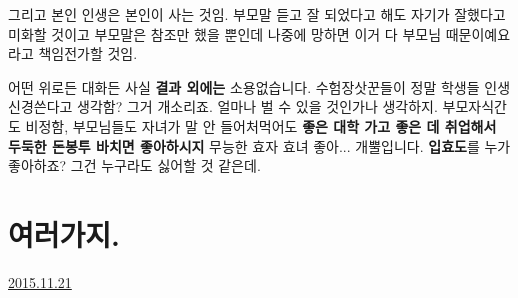 그리고 본인 인생은 본인이 사는 것임.
부모말 듣고 잘 되었다고 해도 자기가 잘했다고 미화할 것이고
부모말은 참조만 했을 뿐인데 나중에 망하면 이거 다 부모님 때문이예요라고 책임전가할 것임.
\vspace{5mm}

어떤 위로든 대화든 사실 \textbf{결과 외에는} 소용없습니다.
수험장삿꾼들이 정말 학생들 인생 신경쓴다고 생각함? 그거 개소리죠. 얼마나 벌 수 있을 것인가나 생각하지.
부모자식간도 비정함, 부모님들도 자녀가 말 안 들어처먹어도 \textbf{좋은 대학 가고 좋은 데 취업해서 두둑한 돈봉투 바치면 좋아하시지}
무능한 효자 효녀 좋아... 개뿔입니다. \textbf{입효도}를 누가 좋아하죠? 그건 누구라도 싫어할 것 같은데.
\vspace{5mm}






\section{여러가지.}
\href{https://www.kockoc.com/Apoc/504237}{2015.11.21}


